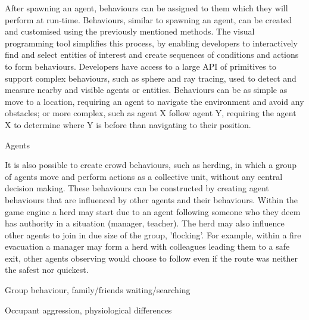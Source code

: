 After spawning an agent, behaviours can be assigned to them which they will perform at run-time. Behaviours, similar to spawning an agent, can be created and customised using the previously mentioned methods. The visual programming tool simplifies this process, by enabling developers to interactively find and select entities of interest and create sequences of conditions and actions to form behaviours. Developers have access to a large API of primitives to support complex behaviours, such as sphere and ray tracing, used to detect and measure nearby and visible agents or entities. Behaviours can be as simple as move to a location, requiring an agent to navigate the environment and avoid any obstacles; or more complex, such as agent X follow agent Y, requiring the agent X to determine where Y is before than navigating to their position. 

Agents 

It is also possible to create crowd behaviours, such as herding, in which a group of agents move and perform actions as a collective unit, without any central decision making. These behaviours can be constructed by creating agent behaviours that are influenced by other agents and their behaviours. Within the game engine a  herd may start due to an agent following someone who they deem has authority in a situation (manager, teacher). The herd may also influence other agents to join in due size of the group, 'flocking'. For example, within a fire evacuation a manager may form a herd with colleagues leading them to a safe exit, other agents observing would choose to follow even if the route was neither the safest nor quickest.

Group behaviour, family/friends waiting/searching

Occupant aggression, physiological differences


